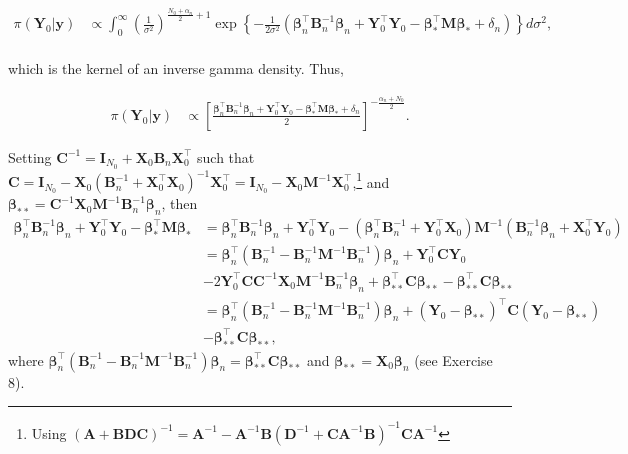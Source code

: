 \begin{align*}
	\pi({\bm{Y}}_0|{\bm{y}})&\propto\int_{0}^{\infty}\left(\frac{1}{\sigma^2}\right)^{\frac{N_0+\alpha_n}{2}+1}\exp\left\{-\frac{1}{2\sigma^2}(\bm{\beta}_n^{\top}{\bm{B}}_n^{-1}\bm{\beta}_n+{\bm{Y}}_0^{\top}{\bm{Y}}_0-\bm{\beta}_*^{\top}{\bm{M}}\bm{\beta}_*+\delta_n)\right\}d\sigma^2,\\
\end{align*}

which is the kernel of an inverse gamma density. Thus,

\begin{align*}
	\pi({\bm{Y}}_0|{\bm{y}})&\propto \left[\frac{\bm{\beta}_n^{\top}{\bm{B}}_n^{-1}\bm{\beta}_n+{\bm{Y}}_0^{\top}{\bm{Y}}_0-\bm{\beta}_*^{\top}{\bm{M}}\bm{\beta}_*+\delta_n}{2}\right]^{-\frac{\alpha_n+N_0}{2}}.
\end{align*}

Setting ${\bm{C}}^{-1}={\bm{I}}_{N_0}+{\bm{X}}_0{\bm{B}}_n{\bm{X}}_0^{\top}$ such that ${\bm{C}}={\bm{I}}_{N_0}-{\bm{X}}_0({\bm{B}}_n^{-1}+{\bm{X}}_0^{\top}{\bm{X}}_0)^{-1}{\bm{X}}_0^{\top}={\bm{I}}_{N_0}-{\bm{X}}_0{\bm{M}}^{-1}{\bm{X}}_0^{\top}$,\footnote{Using $({\bm{A}}+{\bm{B}}{\bm{D}}{\bm{C}})^{-1}={\bm{A}}^{-1}-{\bm{A}}^{-1}{\bm{B}}({\bm{D}}^{-1}+{\bm{C}}{\bm{A}}^{-1}{\bm{B}})^{-1}{\bm{C}}{\bm{A}}^{-1}$} and ${\bm{\bm{\beta}}}_{**}={\bm{C}}^{-1}{\bm{X}}_0{\bm{M}}^{-1}{\bm{B}}_n^{-1}\bm{\beta}_n$, then 
{\footnotesize{
\begin{align*}
	\bm{\beta}_n^{\top}{\bm{B}}_n^{-1}\bm{\beta}_n+{\bm{Y}}_0^{\top}{\bm{Y}}_0-\bm{\beta}_*^{\top}{\bm{M}}\bm{\beta}_*&=
	\bm{\beta}_n^{\top}{\bm{B}}_n^{-1}\bm{\beta}_n+{\bm{Y}}_0^{\top}{\bm{Y}}_0-(\bm{\beta}_n^{\top}{\bm{B}}_n^{-1}+{\bm{Y}}_0^{\top}{\bm{X}}_0){\bm{M}}^{-1}({\bm{B}}_n^{-1}\bm{\beta}_n+{\bm{X}}_0^{\top}{\bm{Y}}_0)\\
	&=\bm{\beta}_n^{\top}({\bm{B}}_n^{-1}-{\bm{B}}_n^{-1}{\bm{M}}^{-1}{\bm{B}}_n^{-1})\bm{\beta}_n+{\bm{Y}}_0^{\top}{\bm{C}}{\bm{Y}}_0\\
	&-2{\bm{Y}}_0^{\top}{\bm{C}}{\bm{C}}^{-1}{\bm{X}}_0{\bm{M}}^{-1}{\bm{B}}_n^{-1}\bm{\beta}_n+{\bm{\bm{\beta}}}_{**}^{\top}{\bm{C}}{\bm{\bm{\beta}}}_{**}-{\bm{\bm{\beta}}}_{**}^{\top}{\bm{C}}{\bm{\bm{\beta}}}_{**}\\
	&=\bm{\beta}_n^{\top}({\bm{B}}_n^{-1}-{\bm{B}}_n^{-1}{\bm{M}}^{-1}{\bm{B}}_n^{-1})\bm{\beta}_n+({\bm{Y}}_0-{\bm{\bm{\beta}}}_{**})^{\top}{\bm{C}}({\bm{Y}}_0-{\bm{\bm{\beta}}}_{**})\\
	&-{\bm{\bm{\beta}}}_{**}^{\top}{\bm{C}}{\bm{\bm{\beta}}}_{**},
\end{align*}
}}
where $\bm{\beta}_n^{\top}({\bm{B}}_n^{-1}-{\bm{B}}_n^{-1}{\bm{M}}^{-1}{\bm{B}}_n^{-1})\bm{\beta}_n={\bm{\bm{\beta}}}_{**}^{\top}{\bm{C}}{\bm{\bm{\beta}}}_{**}$ and $\bm{\beta}_{**}={\bm{X}}_0\bm{\beta}_n$ (see Exercise 8).

